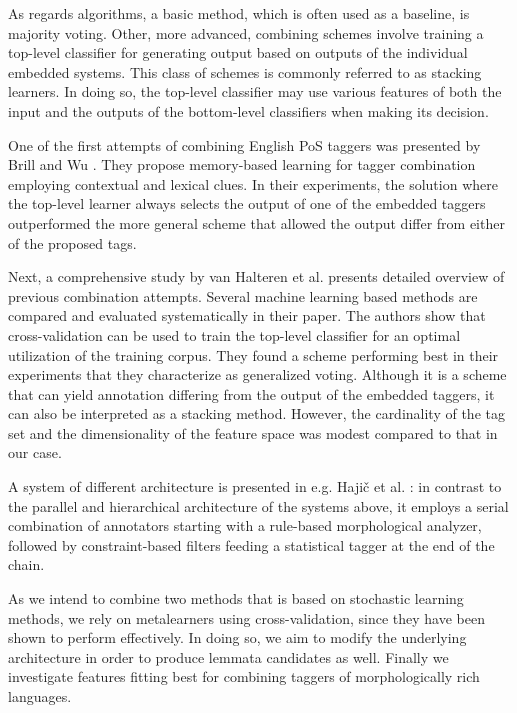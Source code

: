 As regards algorithms, a basic method, which is often used as a baseline, is majority voting.
Other, more advanced, combining schemes involve training a top-level classifier for generating output based on outputs of the individual embedded systems.
This class of schemes is commonly referred to as stacking learners. 
In doing so, the top-level classifier may use various features of both the input and the outputs of the bottom-level classifiers when making its decision. 

One of the first attempts of combining English PoS taggers was presented by Brill and Wu \cite{Brill1998}. 
They propose memory-based learning for tagger combination employing contextual and lexical clues.
In their experiments, the solution where the top-level learner always selects the output of one of the embedded taggers outperformed the more general scheme that allowed the output differ from either of the proposed tags.

Next, a comprehensive study by van Halteren et al. \cite{Halteren2001} presents detailed overview of previous combination attempts.
Several machine learning based methods are compared and evaluated systematically in their paper. 
The authors show that cross-validation can be used to train the top-level classifier for an optimal utilization of the training corpus. 
They found a scheme performing best in their experiments that they characterize as generalized voting. Although it is a scheme that can yield annotation differing from the output of the embedded taggers, it can also be interpreted as a stacking method. 
However, the cardinality of the tag set and the dimensionality of the feature space was modest compared to that in our case.

A system of different architecture is presented in e.g. Hajič et al. \cite{Hajic2001}: in contrast to the parallel and hierarchical architecture of the systems above, it employs a serial combination of annotators starting with a rule-based morphological analyzer, followed by constraint-based filters feeding a statistical tagger at the end of the chain. %

As we intend to combine two methods that is based on stochastic learning methods, we rely on metalearners using cross-validation, since they have been shown \cite{Brill1998,Halteren2001} to perform effectively. In doing so, we aim to modify the underlying architecture in order to produce lemmata candidates as well. Finally we investigate features fitting best for combining taggers of  morphologically rich languages. 

